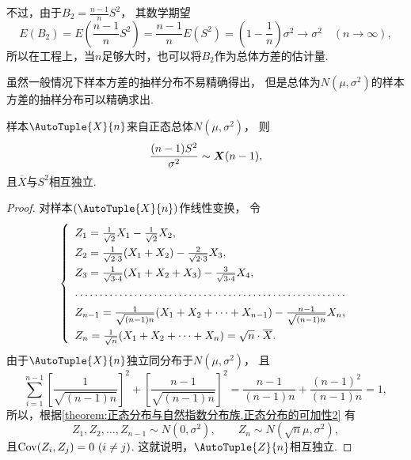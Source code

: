 不过，由于\(B_2 = \frac{n-1}{n} S^2\)，
其数学期望\[
	E(B_2)
	= E\left(\frac{n-1}{n} S^2\right)
	= \frac{n-1}{n} E(S^2)
	= \left(1-\frac1n\right) \sigma^2
	\to \sigma^2
	\quad(n\to\infty),
\]
所以在工程上，当\(n\)足够大时，也可以将\(B_2\)作为总体方差的估计量.

虽然一般情况下样本方差的抽样分布不易精确得出，
但是总体为\(N(\mu,\sigma^2)\)的样本方差的抽样分布可以精确求出.
\begin{theorem}\label{theorem:数理统计的基础知识.正态分布总体下样本方差的抽样分布}
样本\(\AutoTuple{X}{n}\)来自正态总体\(N(\mu,\sigma^2)\)，
则\begin{equation}\label{equation:抽样分布定理.一个正态总体的抽样分布3}
	\frac{(n-1)S^2}{\sigma^2} \sim \boldsymbol{X}(n-1),
\end{equation}
且\(\overline{X}\)与\(S^2\)相互独立.
\begin{proof}
对样本\((\AutoTuple{X}{n})\)作线性变换，
令\[
	\left\{ \def\arraystretch{1.5} \begin{array}{l}
		Z_1 = \frac{1}{\sqrt{2}} X_1 - \frac{1}{\sqrt{2}} X_2, \\
		Z_2 = \frac{1}{\sqrt{2\cdot3}} (X_1+X_2) - \frac{2}{\sqrt{2\cdot3}} X_3, \\
		Z_3 = \frac{1}{\sqrt{3\cdot4}} (X_1+X_2+X_3) - \frac{3}{\sqrt{3\cdot4}} X_4, \\
		\hdotsfor{1} \\
		Z_{n-1} = \frac{1}{\sqrt{(n-1)n}} (X_1+X_2+\dotsb+X_{n-1}) - \frac{n-1}{\sqrt{(n-1)n}} X_n, \\
		Z_n = \frac{1}{\sqrt{n}} (X_1+X_2+\dotsb+X_n) = \sqrt{n} \cdot \overline{X}.
	\end{array} \right.
\]
由于\(\AutoTuple{X}{n}\)独立同分布于\(N(\mu,\sigma^2)\)，
且\[
	\sum_{i=1}^{n-1} \left[ \frac{1}{\sqrt{(n-1)n}} \right]^2
	+ \left[ \frac{n-1}{\sqrt{(n-1)n}} \right]^2
	= \frac{n-1}{(n-1)n}
	+ \frac{(n-1)^2}{(n-1)n}
	= 1,
\]
所以，根据\cref{theorem:正态分布与自然指数分布族.正态分布的可加性2} 有\[
	Z_1,Z_2,\dotsc,Z_{n-1} \sim N(0,\sigma^2), \qquad
	Z_n \sim N(\sqrt{n} \mu,\sigma^2),
\]
且\(\operatorname{Cov}(Z_i,Z_j) = 0\ (i \neq j)\).
这就说明，\(\AutoTuple{Z}{n}\)相互独立.


\end{proof}
\end{theorem}
